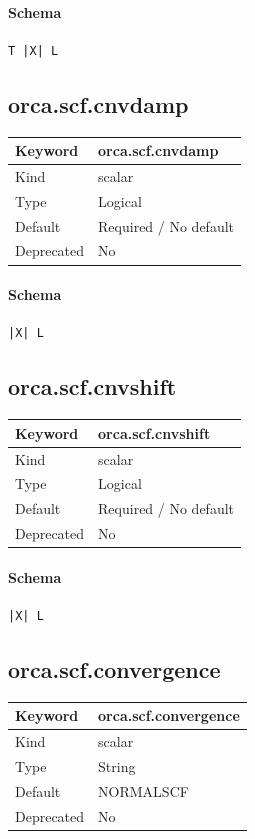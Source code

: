 \documentclass[11pt]{article}
\begin{document}
{{{{{\paragraph{Schema}
\begin{Verbatim}
T |X| L
\end{Verbatim}

\subsection{orca.scf.cnvdamp}
\label{kw:orca-scf-cnvdamp}
\begin{longtable}{|p{1.5in}|p{4.5in}|}
\hline
Keyword & orca.scf.cnvdamp \\
\hline
Kind & scalar \\
\hline
Type & Logical \\
\hline
Default & Required / No default \\
\hline
Deprecated & No \\
\hline
\end{longtable}
\paragraph{Schema}
\begin{Verbatim}
|X| L
\end{Verbatim}

\subsection{orca.scf.cnvshift}
\label{kw:orca-scf-cnvshift}
\begin{longtable}{|p{1.5in}|p{4.5in}|}
\hline
Keyword & orca.scf.cnvshift \\
\hline
Kind & scalar \\
\hline
Type & Logical \\
\hline
Default & Required / No default \\
\hline
Deprecated & No \\
\hline
\end{longtable}
\paragraph{Schema}
\begin{Verbatim}
|X| L
\end{Verbatim}

\subsection{orca.scf.convergence}
\label{kw:orca-scf-convergence}
\begin{longtable}{|p{1.5in}|p{4.5in}|}
\hline
Keyword & orca.scf.convergence \\
\hline
Kind & scalar \\
\hline
Type & String \\
\hline
Default & NORMALSCF \\
\hline
Deprecated & No \\
\hline
\end{longtable}
}}}}}
\end{document}
